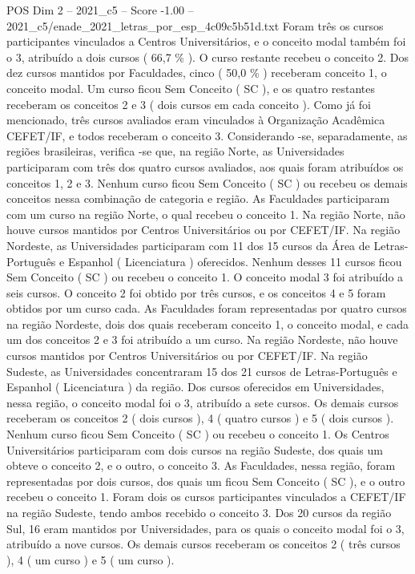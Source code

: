 \begin{textsample}{POS Dim 2 – 2021\_c5 – Score -1.00 – 2021\_c5/enade\_2021\_letras\_por\_esp\_4c09c5b51d.txt}
Foram três os cursos participantes vinculados a Centros Universitários, e o conceito modal também foi o 3, atribuído a dois cursos ( 66,7 \% ).
O curso restante recebeu o conceito 2.
Dos dez cursos mantidos por Faculdades, cinco ( 50,0 \% ) receberam conceito 1, o conceito modal.
Um curso ficou Sem Conceito ( SC ), e os quatro restantes receberam os conceitos 2 e 3 ( dois cursos em cada conceito ).
Como já foi mencionado, três cursos avaliados eram vinculados à Organização Acadêmica CEFET/IF, e todos receberam o conceito 3.
Considerando -se, separadamente, as regiões brasileiras, verifica -se que, na região Norte, as Universidades participaram com três dos quatro cursos avaliados, aos quais foram atribuídos os conceitos 1, 2 e 3.
Nenhum curso ficou Sem Conceito ( SC ) ou recebeu os demais conceitos nessa combinação de categoria e região.
As Faculdades participaram com um curso na região Norte, o qual recebeu o conceito 1.
Na região Norte, não houve cursos mantidos por Centros Universitários ou por CEFET/IF.
Na região Nordeste, as Universidades participaram com 11 dos 15 cursos da Área de Letras-Português e Espanhol ( Licenciatura ) oferecidos.
Nenhum desses 11 cursos ficou Sem Conceito ( SC ) ou recebeu o conceito 1.
O conceito modal 3 foi atribuído a seis cursos.
O conceito 2 foi obtido por três cursos, e os conceitos 4 e 5 foram obtidos por um curso cada.
As Faculdades foram representadas por quatro cursos na região Nordeste, dois dos quais receberam conceito 1, o conceito modal, e cada um dos conceitos 2 e 3 foi atribuído a um curso.
Na região Nordeste, não houve cursos mantidos por Centros Universitários ou por CEFET/IF.
Na região Sudeste, as Universidades concentraram 15 dos 21 cursos de Letras-Português e Espanhol ( Licenciatura ) da região.
Dos cursos oferecidos em Universidades, nessa região, o conceito modal foi o 3, atribuído a sete cursos.
Os demais cursos receberam os conceitos 2 ( dois cursos ), 4 ( quatro cursos ) e 5 ( dois cursos ).
Nenhum curso ficou Sem Conceito ( SC ) ou recebeu o conceito 1.
Os Centros Universitários participaram com dois cursos na região Sudeste, dos quais um obteve o conceito 2, e o outro, o conceito 3.
As Faculdades, nessa região, foram representadas por dois cursos, dos quais um ficou Sem Conceito ( SC ), e o outro recebeu o conceito 1.
Foram dois os cursos participantes vinculados a CEFET/IF na região Sudeste, tendo ambos recebido o conceito 3.
Dos 20 cursos da região Sul, 16 eram mantidos por Universidades, para os quais o conceito modal foi o 3, atribuído a nove cursos.
Os demais cursos receberam os conceitos 2 ( três cursos ), 4 ( um curso ) e 5 ( um curso ).

\end{textsample}
